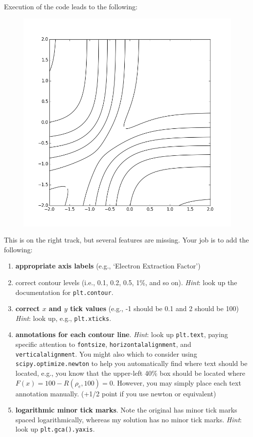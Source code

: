 \documentclass[11pt]{article}
\begin{document}


Execution of the code leads to the following:

\begin{figure}[ht]
    \centering
    \includegraphics[keepaspectratio, width = 3.0 in]
                    {new_contour}
\end{figure}

This is on the right track, but several features are missing.  Your job
is to add the following:
\begin{enumerate}
 \item {\bf appropriate axis labels} (e.g., `Electron Extraction Factor')
 \item correct contour levels (i.e., 0.1, 0.2, 0.5, 1\%, and so on).
       {\it Hint}: look up the documentation for {\tt plt.contour}.
 \item {\bf correct $x$  and $y$ tick values} (e.g., -1 should be 0.1 and 2
       should be 100) {\it Hint}: look up, e.g., {\tt plt.xticks}.
 \item {\bf annotations for each contour line}. {\it Hint}: look up 
       {\tt plt.text}, paying specific attention to {\tt fontsize},
       {\tt horizontalalignment}, and {\tt verticalalignment}. 
       You might also which to consider using {\tt scipy.optimize.newton}
       to help you automatically find where text should be located,
       e.g., you know that the upper-left 40\% box should be located where 
       $F(x) = 100 - R(\rho_e, 100) = 0$.  However, you may simply
       place each text annotation manually.  (+1/2 point if you use newton or equivalent)
 \item {\bf logarithmic minor tick marks}.   Note the 
       original has minor tick marks spaced logarithmically, whereas
       my solution has no minor tick marks.  {\it Hint}: look 
       up {\tt plt.gca().yaxis}.
\end{enumerate}
\end{document}

